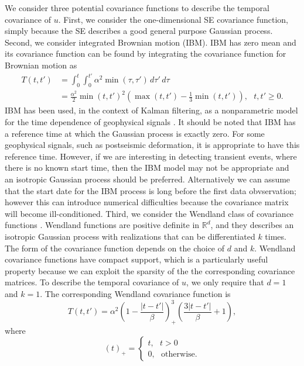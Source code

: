 \documentclass[10pt,a4paper]{article}
\begin{document}
We consider three potential covariance functions to describe the temporal covariance of $u$.  First, we consider the one-dimensional SE covariance function, simply because the SE describes a good general purpose Gaussian process. Second, we consider integrated Brownian motion (IBM). IBM has zero mean and its covariance function can be found by integrating the covariance function for Brownian motion as
\begin{align}\label{eq:IBM}
T(t,t') &= \int_0^t \int_0^{t'} \alpha^2 \min(\tau,\tau') \,d\tau'\,d\tau \\
        &= \frac{\alpha^2}{2}\min(t,t')^2 \left(\max(t,t') - \frac{1}{3}\min(t,t')\right), \ \ \ t,t' \geq 0.
\end{align}
IBM has been used, in the context of Kalman filtering, as a nonparametric model for the time dependence of geophysical signals \citep[e.g.,][]{Segall1997,McGuire2003,Ohtani2010,Hines2016}. It should be noted that IBM has a reference time at which the Gaussian process is exactly zero. For some geophysical signals, such as postseismic deformation, it is appropriate to have this reference time. However, if we are interesting in detecting transient events, where there is no known start time, then the IBM model may not be appropriate and an isotropic Gaussian process should be preferred. Alternatively we can assume that the start date for the IBM process is long before the first data obvservation; however this can introduce numerical difficulties because the covariance matrix will become ill-conditioned. Third, we consider the Wendland class of covariance functions \citep{Wendland2005}. Wendland functions are positive definite in $\mathbb{R}^d$, and they describes an isotropic Gaussian process with realizations that can be differentiated $k$ times. The form of the covariance function depends on the choice of $d$ and $k$. Wendland covariance functions have compact support, which is a particularly useful property because we can exploit the sparsity of the the corresponding covariance matrices. To describe the temporal covariance of $u$, we only require that $d=1$ and $k=1$. The corresponding Wendland covariance function is 
\begin{equation}\label{eq:Wendland}
T(t,t') = \alpha^2\left(1 - \frac{|t - t'|}{\beta}\right)^3_+ \left(\frac{3|t - t'|}{\beta} + 1\right), 
\end{equation}
where
\begin{equation}
(t)_+ = 
\begin{cases}
t, \ \ \ t > 0 \\
0, \ \ \ \mathrm{otherwise}.
\end{cases}
\end{equation}
\end{document}
